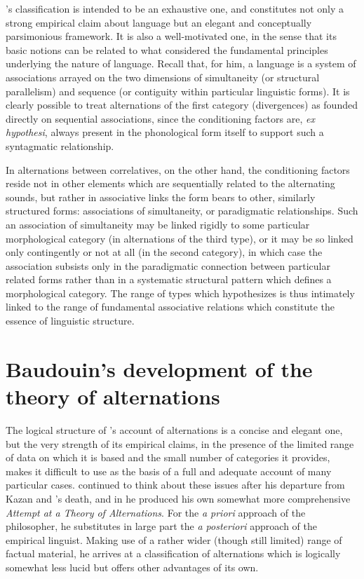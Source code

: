 {\Kruszewski}'s classification is intended to be an exhaustive one, and
constitutes not only a strong empirical claim about language but an
elegant and conceptually parsimonious framework. It is also a
well-motivated one, in the sense that its basic notions can be related
to what {\Kruszewski} considered the fundamental principles underlying
the nature of language. Recall that, for him, a language is a system
of associations arrayed on the two dimensions of simultaneity (or
structural parallelism) and sequence (or contiguity within particular
linguistic forms). It is clearly possible to treat alternations of the
first category (divergences) as founded directly on sequential
associations, since the conditioning factors are, \emph{ex hypothesi},
always present in the phonological form itself to support such a
syntagmatic relationship.

In alternations between correlatives, on the other hand, the
conditioning factors reside not in other elements which are
sequentially related to the alternating sounds, but rather in
associative links the form bears to other, similarly structured forms:
associations of simultaneity, or paradigmatic relationships. Such an
association of simultaneity may be linked rigidly to some particular
morphological category (in alternations of the third type), or it may
be so linked only contingently or not at all (in the second category),
in which case the association subsists only in the paradigmatic
connection between particular related forms rather than in a
systematic structural pattern which defines a morphological
category. The range of  types which {\Kruszewski} hypothesizes
is thus intimately linked to the range of fundamental associative
relations which constitute the essence of linguistic structure.

\section{Baudouin's development of the theory of alternations}

The logical structure of {\Kruszewski}'s account of alternations is a
concise and elegant one, but the very strength of its empirical
claims, in the presence of the limited range of data on which it is
based and the small number of categories it provides, makes it
difficult to use as the basis of a full and adequate account of many
particular cases. {\Baudouin} continued to think about these issues after
his departure from Kazan and {\Kruszewski}'s death, and in
\citeyear{baudouin95:attempt} he produced his own somewhat more
comprehensive \textsl{Attempt at a Theory of Alternations}. For the
\emph{a priori} approach of {\Kruszewski} the philosopher, he substitutes
in large part the \emph{a posteriori} approach of the empirical
linguist. Making use of a rather wider (though still limited) range of
factual material, he arrives at a classification of alternations which
is logically somewhat less lucid but offers other advantages of its
own.

